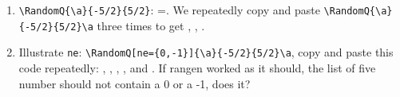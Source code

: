 \documentclass[12pt]{article}
\let\pkg\textsf
\begin{document}
\begin{enumerate}
    \item \verb!\RandomQ{\a}{-5/2}{5/2}!: =\a.
        We repeatedly copy and paste \verb!\RandomQ{\a}{-5/2}{5/2}\a! three
        times to get \a, \a,
        \a.

    \item Illustrate \texttt{ne}:
        \verb!\RandomQ[ne={0,-1}]{\a}{-5/2}{5/2}\a!, copy and paste this
        code repeatedly: \a,
        \a,
        \a,
        \a, and
        \a. If \pkg{rangen} worked as it
        should, the list of five number should not contain a 0 or a -1,
        does it?


\end{enumerate}
\end{document}
